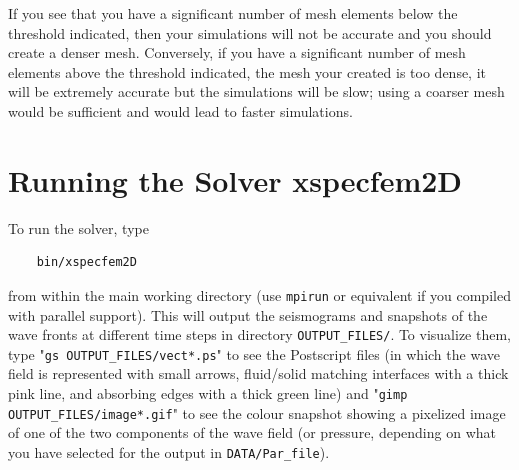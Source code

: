 \documentclass[oneside,english,onecolumn,letterpaper]{book}
\begin{document}
If you see that you have a significant number of mesh elements below the threshold indicated, then your simulations
will not be accurate and you should create a denser mesh. Conversely, if you have a significant number of mesh elements above the threshold indicated,
the mesh your created is too dense, it will be extremely accurate but the simulations will be slow; using a coarser mesh would be sufficient and would lead to faster simulations.


\chapter{Running the Solver xspecfem2D}


To run the solver, type
%
\begin{verbatim}
    bin/xspecfem2D
\end{verbatim}
%
from within the main working directory (use \texttt{mpirun} or equivalent if you compiled with parallel support). This will output the seismograms and snapshots of the wave fronts at different time steps in directory \texttt{OUTPUT\_FILES/}. To visualize them, type "\texttt{gs OUTPUT\_FILES/vect*.ps}" to see the Postscript files (in which the wave field is represented with small arrows, fluid/solid matching interfaces with a thick pink line, and absorbing edges with a thick green line) and "\texttt{gimp OUTPUT\_FILES/image*.gif}" to see the colour snapshot showing a pixelized image of one of the two components of the wave field (or pressure, depending on what you have selected for the output in \texttt{DATA/Par\_file}).
\end{document}
